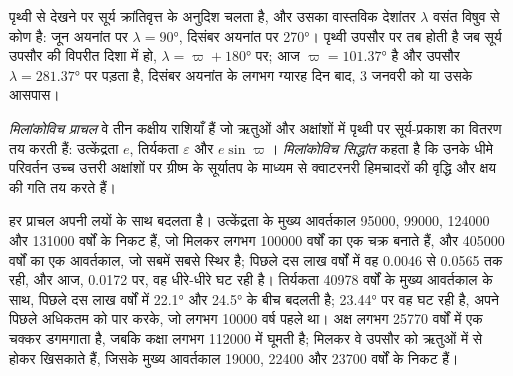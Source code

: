 पृथ्वी से देखने पर सूर्य क्रांतिवृत्त के अनुदिश चलता है, और उसका वास्तविक देशांतर $\lambda$ वसंत विषुव से
कोण है: जून अयनांत पर $\lambda = \ang{90}$, दिसंबर अयनांत पर \ang{270}। पृथ्वी उपसौर पर तब होती है
जब सूर्य उपसौर की विपरीत दिशा में हो,
$\lambda = \varpi + \ang{180}$ पर; आज $\varpi = \ang{101.37}$ है और उपसौर
$\lambda = \ang{281.37}$ पर पड़ता है, दिसंबर अयनांत के लगभग ग्यारह दिन बाद, 3 जनवरी को या उसके आसपास।

\begin{definition}[मिलांकोविच प्राचल]\label{def:b2:orbital-forcing:milankovitch}
\emph{मिलांकोविच प्राचल} वे तीन कक्षीय
राशियाँ हैं जो ऋतुओं और अक्षांशों में पृथ्वी पर सूर्य-प्रकाश का वितरण तय करती हैं:
उत्केंद्रता $e$, तिर्यकता $\varepsilon$ और 
$e\sin\varpi$। \emph{मिलांकोविच सिद्धांत} कहता है कि उनके धीमे
परिवर्तन उच्च उत्तरी अक्षांशों पर ग्रीष्म के सूर्यातप के माध्यम से क्वाटरनरी हिमचादरों की वृद्धि और क्षय की
गति तय करते हैं।
\end{definition}

हर प्राचल अपनी लयों के साथ बदलता है। उत्केंद्रता के मुख्य आवर्तकाल \num{95000},
\num{99000}, \num{124000} और \num{131000} वर्षों के निकट हैं, जो मिलकर लगभग
\num{100000} वर्षों का एक चक्र बनाते हैं, और \num{405000} वर्षों का एक आवर्तकाल, जो सबमें सबसे स्थिर है; पिछले
दस लाख वर्षों में वह \num{0.0046} से \num{0.0565} तक रही, और आज, \num{0.0172} पर, वह धीरे-धीरे
घट रही है। तिर्यकता \num{40978} वर्षों के मुख्य आवर्तकाल के साथ, पिछले दस लाख वर्षों में \ang{22.1} और
\ang{24.5} के बीच बदलती है; \ang{23.44} पर वह घट रही है, अपने पिछले अधिकतम को पार करके, जो
लगभग \num{10000} वर्ष पहले था। अक्ष लगभग \num{25770} वर्षों में एक चक्कर डगमगाता है, जबकि
कक्षा लगभग \num{112000} में घूमती है; मिलकर वे उपसौर को ऋतुओं में से होकर खिसकाते हैं, जिसके
मुख्य आवर्तकाल \num{19000}, \num{22400} और \num{23700} वर्षों के निकट हैं।

